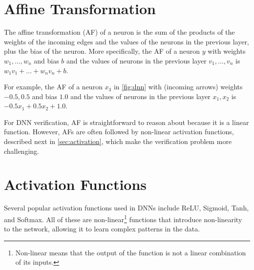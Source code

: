 \section{Affine Transformation}\label{sec:affine}
The affine transformation (AF) of a neuron is the sum of the products of the weights of the incoming edges and the values of the neurons in the previous layer, plus the bias of the neuron.
More specifically, the AF of a neuron \(y\) with weights \(w_1, \dots, w_n\) and bias \(b\) and the values of neurons in the previous layer \(v_1, \dots, v_n\) is \(w_1v_1 + \dots + w_nv_n + b\). 


For example, the AF of a neuron \(x_3\) in \autoref{fig:dnn} with (incoming arrows) weights \(-0.5, 0.5\) and bias \(1.0\) and the values of neurons in the previous layer \(x_1, x_2\) is \(-0.5x_1 + 0.5x_2 + 1.0\).

For DNN verification, AF is straightforward to reason about because it is a linear function. However, AFs are often followed by non-linear activation functions, described next in \autoref{sec:activation}, which make the verification problem more challenging.

\section{Activation Functions}\label{sec:activation}
Several popular activation functions used in DNNs include ReLU, Sigmoid, Tanh, and Softmax. All of these are non-linear\footnote{Non-linear means that the output of the function is not a linear combination of its inputs.} functions that introduce non-linearity to the network, allowing it to learn complex patterns in the data.


